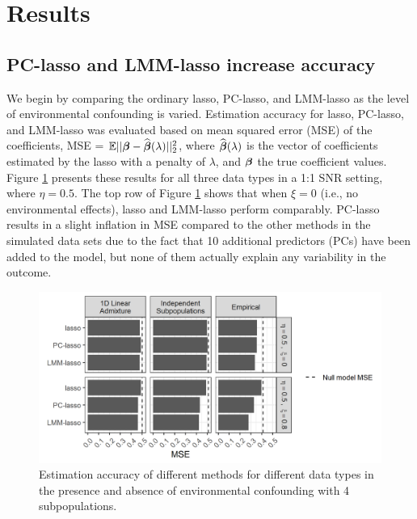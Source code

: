 \section{Results} \label{sec:results}

\subsection{PC-lasso and LMM-lasso increase accuracy}
\label{sec:sim-mse}

We begin by comparing the ordinary lasso, PC-lasso, and LMM-lasso as the level of environmental confounding is varied. Estimation accuracy for lasso, PC-lasso, and LMM-lasso was evaluated based on mean squared error (MSE) of the coefficients, MSE = $\mathbb{E}||\boldsymbol{\beta}{} - \widehat{\boldsymbol{\beta}{}}(\lambda)||^2_2$, where $\widehat{\boldsymbol{\beta}{}}(\lambda)$ is the vector of coefficients estimated by the lasso with a penalty of $\lambda$, and $\boldsymbol{\beta}{}$ the true coefficient values.
Figure \ref{fig:mse} presents these results for all three data types in a 1:1 SNR setting, where $\eta = 0.5$. The top row of Figure \ref{fig:mse} shows that when $\xi = 0$ (i.e., no environmental effects), lasso and LMM-lasso perform comparably. PC-lasso results in a slight inflation in MSE compared to the other methods in the simulated data sets due to the fact that 10 additional predictors (PCs) have been added to the model, but none of them actually explain any variability in the outcome. 

\begin{figure}[H]
    \centering
    \includegraphics[width = \textwidth]{figures/beta_mse.png}
    \caption{Estimation accuracy of different methods for different data types in the presence and absence of environmental confounding with 4 subpopulations.}
    \label{fig:mse}
\end{figure}

